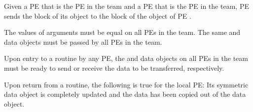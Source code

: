 \begin{apidefinition}
{    Given a \ac{PE}  that is the \kth PE in the team and a \ac{PE}
     that is the \lth \ac{PE} in the team,
    \ac{PE}  sends the \lth block of its \source{} object to
    the \kth block of the \dest{} object of \ac{PE} .

    The values of arguments  must be equal on all \acp{PE}
    in the team.
    The same \dest{} and \source{} data objects must be passed by
    all \acp{PE} in the team.

    Upon entry to a  routine by any \ac{PE}, the
    \source{} and \dest{} data objects on all \acp{PE} in the team must
    be ready to send or receive the data to be transferred, respectively.

    Upon return from a  routine, the following
    is true for the local PE:
    Its \dest{} symmetric data object is completely updated and the data
    has been copied out of the \source{} data object.
}




\end{apidefinition}


